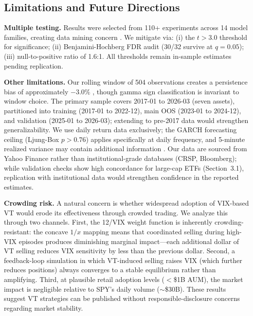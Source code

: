 \subsection{Limitations and Future Directions}

\textbf{Multiple testing.} Results were selected from 110+ experiments across 14 model families, creating data mining concern \citep{harvey2016}. We mitigate via: (i) the $t > 3.0$ threshold for significance; (ii) Benjamini-Hochberg FDR audit (30/32 survive at $q = 0.05$); (iii) null-to-positive ratio of 1.6:1. All thresholds remain in-sample estimates pending replication.

\textbf{Other limitations.} Our rolling window of 504 observations creates a persistence bias of approximately $-3.0\%$ \citep{hwang2006}, though gamma sign classification is invariant to window choice. The primary sample covers 2017-01 to 2026-03 (seven assets), partitioned into training (2017-01 to 2022-12), main OOS (2023-01 to 2024-12), and validation (2025-01 to 2026-03); extending to pre-2017 data would strengthen generalizability. We use daily return data exclusively; the GARCH forecasting ceiling (Ljung-Box $p > 0.76$) applies specifically at daily frequency, and 5-minute realized variance may contain additional information \citep{hansen2012}. Our data are sourced from Yahoo Finance rather than institutional-grade databases (CRSP, Bloomberg); while validation checks show high concordance for large-cap ETFs (Section~3.1), replication with institutional data would strengthen confidence in the reported estimates.

\textbf{Crowding risk.} A natural concern is whether widespread adoption of VIX-based VT would erode its effectiveness through crowded trading. We analyze this through two channels. First, the 12/VIX weight function is inherently crowding-resistant: the concave $1/x$ mapping means that coordinated selling during high-VIX episodes produces diminishing marginal impact---each additional dollar of VT selling reduces VIX sensitivity by less than the previous dollar. Second, a feedback-loop simulation in which VT-induced selling raises VIX (which further reduces positions) always converges to a stable equilibrium rather than amplifying. Third, at plausible retail adoption levels ($<$\$1B AUM), the market impact is negligible relative to SPY's daily volume ($\sim$\$30B). These results suggest VT strategies can be published without responsible-disclosure concerns regarding market stability.

